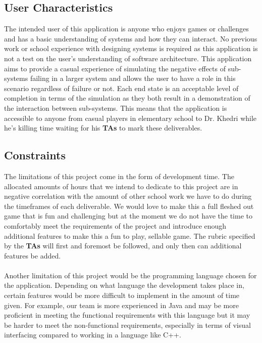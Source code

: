\documentclass[12pt, titlepage]{article}
\newcommand\tab[1][1cm]{\hspace*{#1}}
\begin{document}
\subsection{User Characteristics}
\tab The intended user of this application is anyone who enjoys games or challenges and has a basic understanding of systems and how they can interact. No previous work or school experience with designing systems is required as this application is not a test on the user's understanding of software architecture. This application aims to provide a casual experience of simulating the negative effects of sub-systems failing in a larger system and allows the user to have a role in this scenario regardless of failure or not. Each end state is an acceptable level of completion in terms of the simulation as they both result in a demonstration of the interaction between sub-systems. This means that the application is accessible to anyone from casual players in elementary school to Dr. Khedri while he's killing time waiting for his  \textbf{TAs} to mark these deliverables.

\subsection{Constraints}
\tab The limitations of this project come in the form of development time. The allocated amounts of hours that we intend to dedicate to this project are in negative correlation with the amount of other school work we have to do during the timeframes of each deliverable. We would love to make this a full fleshed out game that is fun and challenging but at the moment we do not have the time to comfortably meet the requirements of the project and introduce enough additional features to make this a fun to play, sellable game. The rubric specified by the  \textbf{TAs} will first and foremost be followed, and only then can additional features be added. \\
\\ \tab Another limitation of this project would be the programming language chosen for the application. Depending on what language the development takes place in, certain features would be more difficult to implement in the amount of time given. For example, our team is more experienced in Java and may be more proficient in meeting the functional requirements with this language but it may be harder to meet the non-functional requirements, especially in terms of visual interfacing compared to working in a language like C++.
\end{document}
